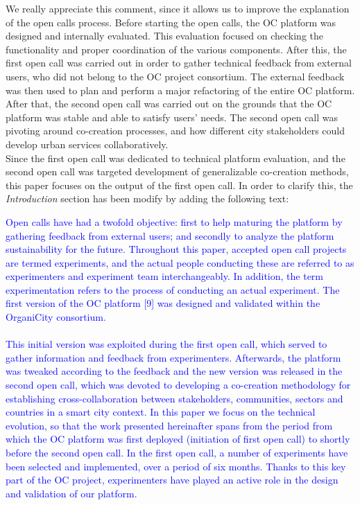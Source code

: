 \documentclass[letterpaper]{article}
\newcommand{\PaperExcerpt}[1]%
{\begin{center}\begin{minipage}{0.9\textwidth}{\begin{bfseries}\textcolor{blue}{#1}\end{bfseries}}\end{minipage}\end{center}\vspace{12pt}}
\begin{document}
	{	
		We really appreciate this comment, since it allows us to improve the explanation of the open calls process. Before starting the open calls, the OC platform was designed and internally evaluated. This evaluation focused on checking the functionality and proper coordination of the various components. After this, the first open call was carried out in order to gather technical feedback from external users, who did not belong to the OC project consortium. The external feedback was then used to plan and perform a major refactoring of the entire OC platform. After that, the second open call was carried out on the grounds that the OC platform was stable and able to satisfy users' needs. The second open call was pivoting around co-creation processes, and how different city stakeholders could develop urban services collaboratively.\\
		
		Since the first open call was dedicated to technical platform evaluation, and the second open call was targeted development of generalizable co-creation methods, this paper focuses on the output of the first open call. In order to clarify this, the \emph{Introduction} section has been modify by adding the following text:
		
		\PaperExcerpt{Open calls have had a twofold objective: first to help maturing the platform by gathering feedback from external users; and secondly to analyze the platform sustainability for the future. Throughout this paper, accepted open call projects are termed experiments, and the actual people conducting these are referred to as experimenters and experiment team interchangeably. In addition, the term experimentation refers to the process of conducting an actual experiment.
		The first version of the OC platform [9] was designed and validated within the OrganiCity consortium.\\\\
		This initial version was exploited during the first open call, which served to gather information and feedback from experimenters. Afterwards, the platform was tweaked according to the feedback and the new version was released in the second open call, which was devoted to developing a co-creation methodology for establishing cross-collaboration between stakeholders, communities, sectors and countries in a smart city context.
		In this paper we focus on the technical evolution, so that the work presented hereinafter spans from the period from which the OC platform was first deployed (initiation of first open call) to shortly before the second open call. In the first open call, a number of experiments have been selected and implemented, over a period of six months. Thanks to this key part of the OC project, experimenters have played an active role in the design and validation of our platform.}
	}		
\end{document}
